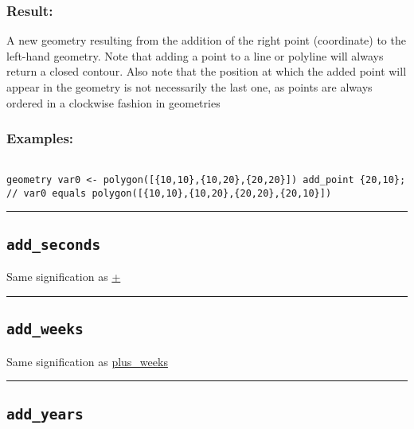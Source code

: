 \documentclass[]{book}
\theoremstyle{definition}
\theoremstyle{definition}
\theoremstyle{definition}
\theoremstyle{remark}
\begin{document}
\subsubsection{Result:}\label{result-21}

A new geometry resulting from the addition of the right point
(coordinate) to the left-hand geometry. Note that adding a point to a
line or polyline will always return a closed contour. Also note that the
position at which the added point will appear in the geometry is not
necessarily the last one, as points are always ordered in a clockwise
fashion in geometries

\subsubsection{Examples:}\label{examples-17}

\begin{verbatim}
 
geometry var0 <- polygon([{10,10},{10,20},{20,20}]) add_point {20,10}; // var0 equals polygon([{10,10},{10,20},{20,20},{20,10}])
\end{verbatim}

\begin{center}\rule{0.5\linewidth}{\linethickness}\end{center}

\subsection{\texorpdfstring{\texttt{add\_seconds}}{add\_seconds}}\label{add_seconds}

Same signification as \href{OperatorsAA\#+}{+}

\begin{center}\rule{0.5\linewidth}{\linethickness}\end{center}

\subsection{\texorpdfstring{\texttt{add\_weeks}}{add\_weeks}}\label{add_weeks}

Same signification as \href{OperatorsNR\#plus_weeks}{plus\_weeks}

\begin{center}\rule{0.5\linewidth}{\linethickness}\end{center}

\subsection{\texorpdfstring{\texttt{add\_years}}{add\_years}}\label{add_years}
\end{document}
